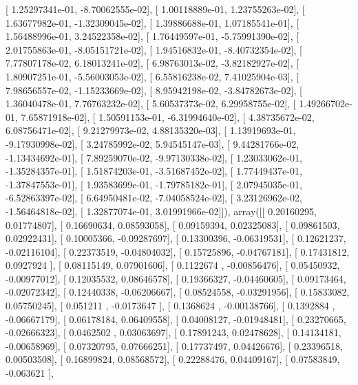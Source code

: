 \documentclass{article}
\begin{document}
       [  1.25297341e-01,  -8.70062555e-02],
       [  1.00118889e-01,   1.23755263e-02],
       [  1.63677982e-01,  -1.32309045e-02],
       [  1.39886688e-01,   1.07185541e-01],
       [  1.56488996e-01,   3.24522358e-02],
       [  1.76449597e-01,  -5.75991390e-02],
       [  2.01755863e-01,  -8.05151721e-02],
       [  1.94516832e-01,  -8.40732354e-02],
       [  7.77807178e-02,   6.18013241e-02],
       [  6.98763013e-02,  -3.82182927e-02],
       [  1.80907251e-01,  -5.56003053e-02],
       [  6.55816238e-02,   7.41025904e-03],
       [  7.98656557e-02,  -1.15233669e-02],
       [  8.95942198e-02,  -3.84782673e-02],
       [  1.36040478e-01,   7.76763232e-02],
       [  5.60537373e-02,   6.29958755e-02],
       [  1.49266702e-01,   7.65871918e-02],
       [  1.50591153e-01,  -6.31994640e-02],
       [  4.38735672e-02,   6.08756471e-02],
       [  9.21279973e-02,   4.88135320e-03],
       [  1.13919693e-01,  -9.17930998e-02],
       [  3.24785992e-02,   5.94545147e-03],
       [  9.44281766e-02,  -1.13434692e-01],
       [  7.89259070e-02,  -9.97130338e-02],
       [  1.23033062e-01,  -1.35284357e-01],
       [  1.51874203e-01,  -3.51687452e-02],
       [  1.77449437e-01,  -1.37847553e-01],
       [  1.93583699e-01,  -1.79785182e-01],
       [  2.07945035e-01,  -6.52863397e-02],
       [  6.64950481e-02,  -7.04058524e-02],
       [  3.23126962e-02,  -1.56464818e-02],
       [  1.32877074e-01,   3.01991966e-02]]), array([[ 0.20160295,  0.01774807],
       [ 0.16690634,  0.08593058],
       [ 0.09159394,  0.02325083],
       [ 0.09861503,  0.02922431],
       [ 0.10005366, -0.09287697],
       [ 0.13300396, -0.06319531],
       [ 0.12621237, -0.02116104],
       [ 0.22373519, -0.04804032],
       [ 0.15725896, -0.04767181],
       [ 0.17431812,  0.0927924 ],
       [ 0.08115149,  0.07901606],
       [ 0.1122674 , -0.00856476],
       [ 0.05450932, -0.00977012],
       [ 0.12035532,  0.08646578],
       [ 0.19366327, -0.04460605],
       [ 0.09173464, -0.02072342],
       [ 0.12440338, -0.06206667],
       [ 0.08524558, -0.03291956],
       [ 0.15833082,  0.05750245],
       [ 0.051211  , -0.0173647 ],
       [ 0.1368624 , -0.00138766],
       [ 0.1392884 , -0.06667179],
       [ 0.06178184,  0.06409558],
       [ 0.04008127, -0.01948481],
       [ 0.23270665, -0.02666323],
       [ 0.0462502 ,  0.03063697],
       [ 0.17891243,  0.02478628],
       [ 0.14134181, -0.00658969],
       [ 0.07320795,  0.07666251],
       [ 0.17737497,  0.04426676],
       [ 0.23396518,  0.00503508],
       [ 0.16899824,  0.08568572],
       [ 0.22288476,  0.04409167],
       [ 0.07583849, -0.063621  ],
\end{document}
